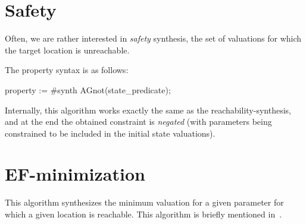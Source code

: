 %
%
%
%



\section{Safety}\label{ss:mode:EF}

Often, we are rather interested in \emph{safety} synthesis, \ie{} the set of valuations for which the target location is unreachable.

The property syntax is as follows:

\begin{IMITATORproperty}
property := #synth AGnot(state_predicate);
\end{IMITATORproperty}

Internally, this algorithm works exactly the same as the reachability-synthesis, and at the end the obtained constraint is \emph{negated} (with parameters being constrained to be included in the initial state valuations).


\section{EF-minimization}\label{ss:mode:EFmin}

This algorithm synthesizes the minimum valuation for a given parameter for which a given location is reachable.
This algorithm is briefly mentioned in~\cite{ABPV19}.


